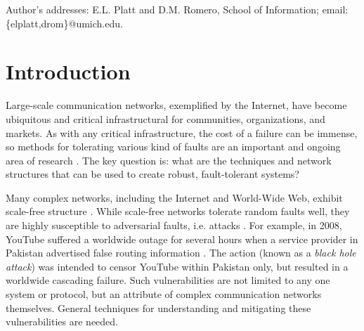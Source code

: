 \documentclass[prodmode,permissions]{acmsmall-ec16}
\begin{document}



\begin{bottomstuff}
Author's addresses: E.L. Platt and D.M. Romero, School of Information; email: \{elplatt,drom\}@umich.edu.
\end{bottomstuff}

\maketitle


\section{Introduction}

Large-scale communication networks, exemplified by the Internet,
have become ubiquitous and critical infrastructural for
communities, organizations, and markets.
As with any critical infrastructure, the cost of a failure can be
immense, so methods for tolerating various kind of faults are an
important and ongoing area of research
\cite{zin_survey_2015,albert_error_2000,sterbenz_resilience_2010}.
The key question is: what are the techniques and network structures that can
be used to create robust, fault-tolerant systems?

Many complex networks, including the Internet and World-Wide Web, exhibit
scale-free structure
\cite{barabasi_emergence_1999,barabasi_scale-free_2009}.
While scale-free networks tolerate random faults well,
they are highly susceptible to adversarial faults, i.e. attacks
\cite{albert_error_2000}.
For example, in 2008, YouTube suffered a worldwide outage for several hours
when a service provider in Pakistan advertised false routing information
\cite{hunter_pakistan_2008}.
The action (known as a {\em black hole attack}) was intended to censor YouTube
within Pakistan only, but resulted in a worldwide cascading failure.
Such vulnerabilities are not limited to any one system or protocol, but an
attribute of complex communication networks themselves.
General techniques for understanding and mitigating these vulnerabilities are
needed.
\end{document}
